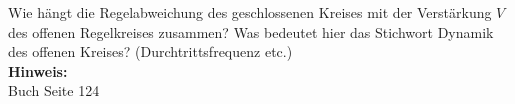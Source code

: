 \begin{question}[section=4,name={Regelabweichung eines geschlossenen Kreises},difficulty=,type=mdl,tags={}]
	Wie hängt die Regelabweichung des geschlossenen Kreises mit der Verstärkung $V$ des offenen Regelkreises zusammen? Was bedeutet hier das Stichwort Dynamik des offenen Kreises? (Durchtrittsfrequenz etc.)
	\\ \textbf{Hinweis:}\\
	Buch Seite 124
\end{question}
\begin{solution}
	
\end{solution}